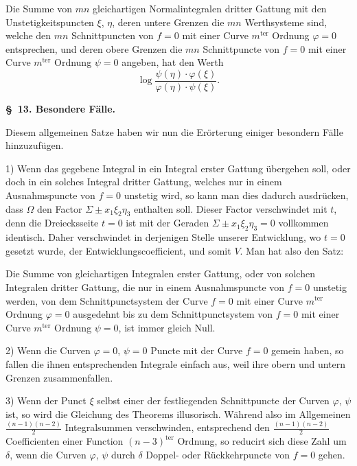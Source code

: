 \documentclass[10pt]{article}
\begin{document}
Die Summe von $mn$ gleichartigen Normalintegralen dritter Gattung mit den Unstetigkeitspuncten $\xi$, $\eta$, deren untere Grenzen die $mn$ Werthsysteme sind, welche den $mn$ Schnittpuncten von $f=0$ mit einer Curve $m^{\text{ter}}$ Ordnung $\varphi=0$ entsprechen, und deren obere Grenzen die $mn$ Schnittpuncte von $f=0$ mit einer Curve $m^{\text{ter}}$ Ordnung $\psi=0$ angeben, hat den Werth
\[
\log\frac{\psi(\eta)\cdot\varphi(\xi)}{\varphi(\eta)\cdot\psi(\xi)}.
\]

\begin{center}
{\bfseries \S\ 13. Besondere Fälle.}
\end{center}

Diesem allgemeinen Satze haben wir nun die Erörterung einiger besondern Fälle hinzuzufügen.

1) Wenn das gegebene Integral in ein Integral erster Gattung übergehen soll, oder doch in ein solches Integral dritter Gattung, welches nur in einem Ausnahmspuncte von $f=0$ unstetig wird, so kann man dies dadurch ausdrücken, dass $\Omega$ den Factor $\Sigma\pm x_1\xi_2\eta_3$ enthalten soll. Dieser Factor verschwindet mit $t$, denn die Dreiecksseite $t=0$ ist mit der Geraden $\Sigma\pm x_1\xi_2\eta_3=0$ vollkommen identisch. Daher verschwindet in derjenigen Stelle unserer Entwicklung, wo $t=0$ gesetzt wurde, der Entwicklungscoefficient, und somit $V$. Man hat also den Satz:

Die Summe von gleichartigen Integralen erster Gattung, oder von solchen Integralen dritter Gattung, die nur in einem Ausnahmspuncte von $f=0$ unstetig werden, von dem Schnittpunctsystem der Curve $f=0$ mit einer Curve $m^{\text{ter}}$ Ordnung $\varphi=0$ ausgedehnt bis zu dem Schnittpunctsystem von $f=0$ mit einer Curve $m^{\text{ter}}$ Ordnung $\psi=0$, ist immer gleich Null.

2) Wenn die Curven $\varphi=0$, $\psi=0$ Puncte mit der Curve $f=0$ gemein haben, so fallen die ihnen entsprechenden Integrale einfach aus, weil ihre obern und untern Grenzen zusammenfallen.

3) Wenn der Punct $\xi$ selbst einer der festliegenden Schnittpuncte der Curven $\varphi$, $\psi$ ist, so wird die Gleichung des Theorems illusorisch. Während also im Allgemeinen $\frac{(n-1)(n-2)}{2}$ Integralsummen verschwinden, entsprechend den $\frac{(n-1)(n-2)}{2}$ Coefficienten einer Function $(n-3)^{\text{ter}}$ Ordnung, so reducirt sich diese Zahl um $\delta$, wenn die Curven $\varphi$, $\psi$ durch $\delta$ Doppel- oder Rückkehrpuncte von $f=0$ gehen.
\end{document}
